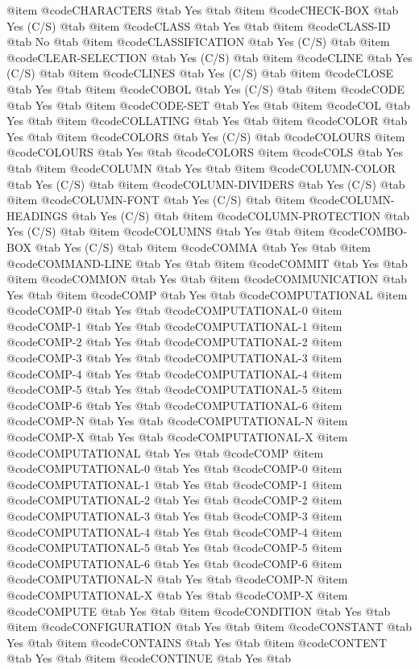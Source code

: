 @item @code{CHARACTERS} @tab Yes @tab
@item @code{CHECK-BOX} @tab Yes	(C/S) @tab
@item @code{CLASS} @tab Yes @tab
@item @code{CLASS-ID} @tab No @tab
@item @code{CLASSIFICATION} @tab Yes	(C/S) @tab
@item @code{CLEAR-SELECTION} @tab Yes	(C/S) @tab
@item @code{CLINE} @tab Yes	(C/S) @tab
@item @code{CLINES} @tab Yes	(C/S) @tab
@item @code{CLOSE} @tab Yes @tab
@item @code{COBOL} @tab Yes	(C/S) @tab
@item @code{CODE} @tab Yes @tab
@item @code{CODE-SET} @tab Yes @tab
@item @code{COL} @tab Yes @tab
@item @code{COLLATING} @tab Yes @tab
@item @code{COLOR} @tab Yes @tab
@item @code{COLORS} @tab Yes	(C/S) @tab @code{COLOURS}
@item @code{COLOURS} @tab Yes @tab @code{COLORS}
@item @code{COLS} @tab Yes @tab
@item @code{COLUMN} @tab Yes @tab
@item @code{COLUMN-COLOR} @tab Yes	(C/S) @tab
@item @code{COLUMN-DIVIDERS} @tab Yes	(C/S) @tab
@item @code{COLUMN-FONT} @tab Yes	(C/S) @tab
@item @code{COLUMN-HEADINGS} @tab Yes	(C/S) @tab
@item @code{COLUMN-PROTECTION} @tab Yes	(C/S) @tab
@item @code{COLUMNS} @tab Yes @tab
@item @code{COMBO-BOX} @tab Yes	(C/S) @tab
@item @code{COMMA} @tab Yes @tab
@item @code{COMMAND-LINE} @tab Yes @tab
@item @code{COMMIT} @tab Yes @tab
@item @code{COMMON} @tab Yes @tab
@item @code{COMMUNICATION} @tab Yes @tab
@item @code{COMP} @tab Yes @tab @code{COMPUTATIONAL}
@item @code{COMP-0} @tab Yes @tab @code{COMPUTATIONAL-0}
@item @code{COMP-1} @tab Yes @tab @code{COMPUTATIONAL-1}
@item @code{COMP-2} @tab Yes @tab @code{COMPUTATIONAL-2}
@item @code{COMP-3} @tab Yes @tab @code{COMPUTATIONAL-3}
@item @code{COMP-4} @tab Yes @tab @code{COMPUTATIONAL-4}
@item @code{COMP-5} @tab Yes @tab @code{COMPUTATIONAL-5}
@item @code{COMP-6} @tab Yes @tab @code{COMPUTATIONAL-6}
@item @code{COMP-N} @tab Yes @tab @code{COMPUTATIONAL-N}
@item @code{COMP-X} @tab Yes @tab @code{COMPUTATIONAL-X}
@item @code{COMPUTATIONAL} @tab Yes @tab @code{COMP}
@item @code{COMPUTATIONAL-0} @tab Yes @tab @code{COMP-0}
@item @code{COMPUTATIONAL-1} @tab Yes @tab @code{COMP-1}
@item @code{COMPUTATIONAL-2} @tab Yes @tab @code{COMP-2}
@item @code{COMPUTATIONAL-3} @tab Yes @tab @code{COMP-3}
@item @code{COMPUTATIONAL-4} @tab Yes @tab @code{COMP-4}
@item @code{COMPUTATIONAL-5} @tab Yes @tab @code{COMP-5}
@item @code{COMPUTATIONAL-6} @tab Yes @tab @code{COMP-6}
@item @code{COMPUTATIONAL-N} @tab Yes @tab @code{COMP-N}
@item @code{COMPUTATIONAL-X} @tab Yes @tab @code{COMP-X}
@item @code{COMPUTE} @tab Yes @tab
@item @code{CONDITION} @tab Yes @tab
@item @code{CONFIGURATION} @tab Yes @tab
@item @code{CONSTANT} @tab Yes @tab
@item @code{CONTAINS} @tab Yes @tab
@item @code{CONTENT} @tab Yes @tab
@item @code{CONTINUE} @tab Yes @tab
